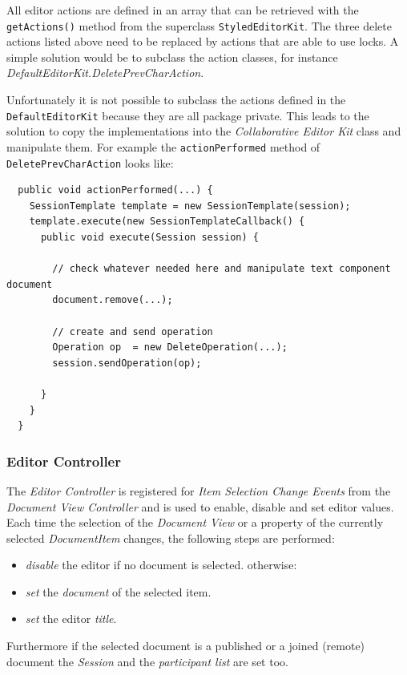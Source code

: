 All editor actions are defined in an array that can be retrieved with the \texttt{getActions()} method from the superclass \texttt{StyledEditorKit}. The three delete actions listed above need to be replaced by actions that are able to use locks. A simple solution would be to subclass the action classes,
for instance \textit{Default\-Editor\-Kit.Delete\-Prev\-Char\-Action}.

%    
%      

Unfortunately it is not possible to subclass the actions defined in the \texttt{DefaultEditorKit} because they are all package private. This leads to the solution to copy the implementations into the \textit{Collaborative Editor Kit} class and manipulate them. For example the \texttt{actionPerformed} method of \texttt{DeletePrevCharAction} looks like:
\begin{verbatim}
  public void actionPerformed(...) {
    SessionTemplate template = new SessionTemplate(session);
    template.execute(new SessionTemplateCallback() {
      public void execute(Session session) {

        // check whatever needed here and manipulate text component document
        document.remove(...);
        
        // create and send operation
        Operation op  = new DeleteOperation(...);
        session.sendOperation(op);

      }
    }
  }
\end{verbatim}


\subsubsection{Editor Controller}
The \textit{Editor Controller} is registered for \textit{Item Selection Change Events} from the \textit{Document View Controller} and is used to enable, disable and set editor values. Each time the selection of the \textit{Document View} or a property of the currently selected \textit{Document\-Item} changes, the following steps are performed:
\begin{itemize}
\item \textit{disable} the editor if no document is selected. otherwise:
\item \textit{set} the \textit{document} of the selected item.
\item \textit{set} the editor \textit{title}.
\end{itemize}
Furthermore if the selected document is a published or a joined (remote) document the \textit{Session} and the \textit{participant list} are set too.

